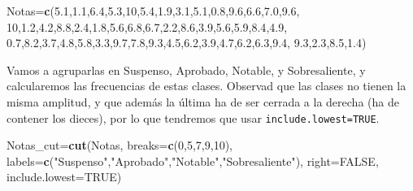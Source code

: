 \documentclass[]{book}
\newenvironment{Shaded}{\begin{snugshade}}{\end{snugshade}}
\newcommand{\DataTypeTok}[1]{\textcolor[rgb]{0.13,0.29,0.53}{#1}}
\newcommand{\DecValTok}[1]{\textcolor[rgb]{0.00,0.00,0.81}{#1}}
\newcommand{\FloatTok}[1]{\textcolor[rgb]{0.00,0.00,0.81}{#1}}
\newcommand{\KeywordTok}[1]{\textcolor[rgb]{0.13,0.29,0.53}{\textbf{#1}}}
\newcommand{\NormalTok}[1]{#1}
\newcommand{\OtherTok}[1]{\textcolor[rgb]{0.56,0.35,0.01}{#1}}
\newcommand{\StringTok}[1]{\textcolor[rgb]{0.31,0.60,0.02}{#1}}
\theoremstyle{definition}
\theoremstyle{definition}
\theoremstyle{definition}
\theoremstyle{remark}
\begin{document}
\begin{Shaded}
\begin{Highlighting}[]
\NormalTok{Notas=}\KeywordTok{c}\NormalTok{(}\FloatTok{5.1}\NormalTok{,}\FloatTok{1.1}\NormalTok{,}\FloatTok{6.4}\NormalTok{,}\FloatTok{5.3}\NormalTok{,}\DecValTok{10}\NormalTok{,}\FloatTok{5.4}\NormalTok{,}\FloatTok{1.9}\NormalTok{,}\FloatTok{3.1}\NormalTok{,}\FloatTok{5.1}\NormalTok{,}\FloatTok{0.8}\NormalTok{,}\FloatTok{9.6}\NormalTok{,}\FloatTok{6.6}\NormalTok{,}\FloatTok{7.0}\NormalTok{,}\FloatTok{9.6}\NormalTok{,}
  \DecValTok{10}\NormalTok{,}\FloatTok{1.2}\NormalTok{,}\FloatTok{4.2}\NormalTok{,}\FloatTok{8.8}\NormalTok{,}\FloatTok{2.4}\NormalTok{,}\FloatTok{1.8}\NormalTok{,}\FloatTok{5.6}\NormalTok{,}\FloatTok{6.8}\NormalTok{,}\FloatTok{6.7}\NormalTok{,}\FloatTok{2.2}\NormalTok{,}\FloatTok{8.6}\NormalTok{,}\FloatTok{3.9}\NormalTok{,}\FloatTok{5.6}\NormalTok{,}\FloatTok{5.9}\NormalTok{,}\FloatTok{8.4}\NormalTok{,}\FloatTok{4.9}\NormalTok{,}
  \FloatTok{0.7}\NormalTok{,}\FloatTok{8.2}\NormalTok{,}\FloatTok{3.7}\NormalTok{,}\FloatTok{4.8}\NormalTok{,}\FloatTok{5.8}\NormalTok{,}\FloatTok{3.3}\NormalTok{,}\FloatTok{9.7}\NormalTok{,}\FloatTok{7.8}\NormalTok{,}\FloatTok{9.3}\NormalTok{,}\FloatTok{4.5}\NormalTok{,}\FloatTok{6.2}\NormalTok{,}\FloatTok{3.9}\NormalTok{,}\FloatTok{4.7}\NormalTok{,}\FloatTok{6.2}\NormalTok{,}\FloatTok{6.3}\NormalTok{,}\FloatTok{9.4}\NormalTok{,}
  \FloatTok{9.3}\NormalTok{,}\FloatTok{2.3}\NormalTok{,}\FloatTok{8.5}\NormalTok{,}\FloatTok{1.4}\NormalTok{)}
\end{Highlighting}
\end{Shaded}

Vamos a agruparlas en Suspenso, Aprobado, Notable, y Sobresaliente, y calcularemos las frecuencias de estas clases. Observad que las clases no tienen la misma amplitud, y que además la última ha de ser cerrada a la derecha (ha de contener los dieces), por lo que tendremos que usar \texttt{include.lowest=TRUE}.

\begin{Shaded}
\begin{Highlighting}[]
\NormalTok{Notas_cut=}\KeywordTok{cut}\NormalTok{(Notas, }\DataTypeTok{breaks=}\KeywordTok{c}\NormalTok{(}\DecValTok{0}\NormalTok{,}\DecValTok{5}\NormalTok{,}\DecValTok{7}\NormalTok{,}\DecValTok{9}\NormalTok{,}\DecValTok{10}\NormalTok{),}
  \DataTypeTok{labels=}\KeywordTok{c}\NormalTok{(}\StringTok{"Suspenso"}\NormalTok{,}\StringTok{"Aprobado"}\NormalTok{,}\StringTok{"Notable"}\NormalTok{,}\StringTok{"Sobresaliente"}\NormalTok{),}
  \DataTypeTok{right=}\OtherTok{FALSE}\NormalTok{, }\DataTypeTok{include.lowest=}\OtherTok{TRUE}\NormalTok{)}
\end{Highlighting}
\end{Shaded}
\end{document}
